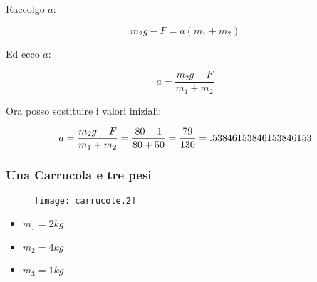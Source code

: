 Raccolgo $a$:

\begin{equation}
m_2g -F = a(m_1 + m_2)
\end{equation}

Ed ecco $a$:

\begin{equation}
a=\frac{
m_2g -F
}{
m_1 + m_2
}
\end{equation}

Ora posso sostituire i valori iniziali:

\begin{equation}
a=\frac{ m_2g -F }{ m_1 + m_2 } =  \\
\frac{80-1}{80+50} = \\
\frac{79}{130} = \\
.53846153846153846153
\end{equation}


\begin{minipage}{\textwidth}

\subsubsection{Una Carrucola e tre pesi}

\begin{figure}[H]
\centering
\texttt{[image: carrucole.2]}
\end{figure}

\begin{itemize}
\item $m_1=2 kg$
\item $m_2=4 kg$
\item $m_3=1 kg$
\end{itemize}

\end{minipage}


